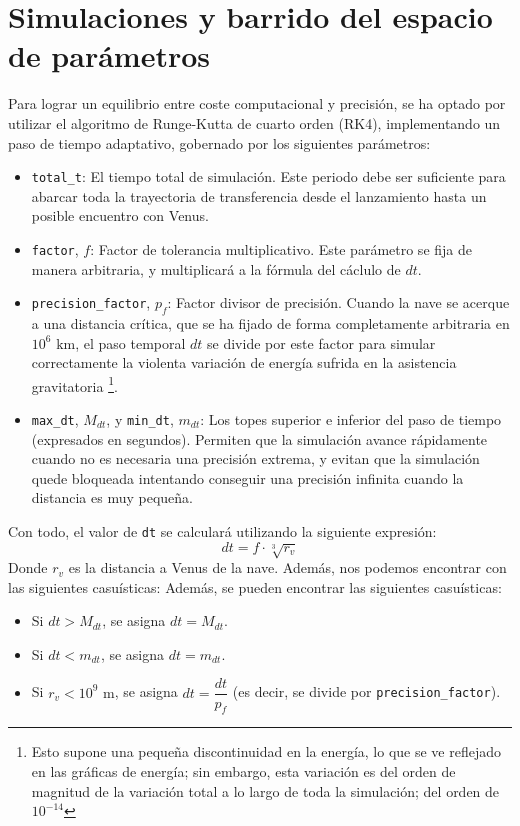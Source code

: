 \section{Simulaciones y barrido del espacio de parámetros}
Para lograr un equilibrio entre coste computacional y precisión, se ha optado por utilizar
el algoritmo de Runge-Kutta de cuarto orden (RK4), implementando un paso de 
tiempo adaptativo, gobernado por los siguientes parámetros:
\begin{itemize}
    \item \texttt{total\_t}: El tiempo total de simulación.
    Este periodo debe ser suficiente para abarcar toda la trayectoria de transferencia desde el lanzamiento 
    hasta un posible encuentro con Venus.
    \item \texttt{factor}, $f$: Factor de tolerancia multiplicativo. 
    Este parámetro se fija de manera arbitraria, y multiplicará a la fórmula del cáclulo de $dt$.
    \item \texttt{precision\_factor}, $p_f$: Factor divisor de precisión. 
    Cuando la nave se acerque a una distancia crítica, que se ha fijado
    de forma completamente arbitraria en $10^6\text{ km}$, el paso temporal $dt$ se divide por 
    este factor para simular correctamente la violenta variación de energía sufrida en la asistencia gravitatoria
    \footnote{Esto supone una pequeña discontinuidad en la energía, lo que se ve reflejado en las gráficas
    de energía; sin embargo, esta variación es del orden de magnitud de la variación total a lo largo de toda la simulación;
    del orden de $10^{-14}$}.
    \item \texttt{max\_dt}, $M_{dt}$, y \texttt{min\_dt}, $m_{dt}$: Los topes superior e 
    inferior del paso de tiempo (expresados en segundos). Permiten que la simulación 
    avance rápidamente cuando no es necesaria una precisión extrema, y evitan que la simulación 
    quede bloqueada intentando conseguir una precisión infinita cuando la distancia es muy pequeña.
\end{itemize}
Con todo, el valor de \texttt{dt} se calculará utilizando la siguiente expresión:
$$
dt = f \cdot \sqrt[3]{r_v}
$$
Donde $r_v$ es la distancia a Venus de la nave.
Además, nos podemos encontrar con las siguientes casuísticas:
Además, se pueden encontrar las siguientes casuísticas:
\begin{itemize}
    \item Si $dt > M_{dt}$, se asigna $dt = M_{dt}$.
    \item Si $dt < m_{dt}$, se asigna $dt = m_{dt}$.
    \item Si $r_v < 10^9\text{ m}$, se asigna $dt = \dfrac{dt}{p_f}$ (es decir, se divide por \texttt{precision\_factor}).
\end{itemize}

